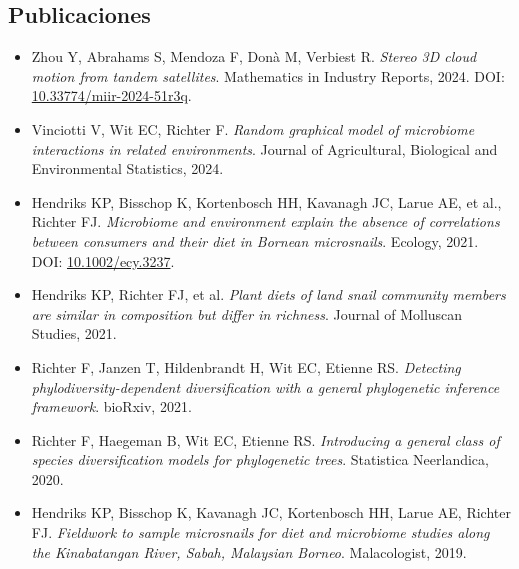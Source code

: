 \documentclass[11pt,a4paper]{article}
\begin{document}
\subsection{Publicaciones}
\begin{itemize}
    \item Zhou Y, Abrahams S, Mendoza F, Donà M, Verbiest R. \textit{Stereo 3D cloud motion from tandem satellites}. Mathematics in Industry Reports, 2024. DOI: \href{https://doi.org/10.33774/miir-2024-51r3q}{10.33774/miir-2024-51r3q}.
    \item Vinciotti V, Wit EC, Richter F. \textit{Random graphical model of microbiome interactions in related environments}. Journal of Agricultural, Biological and Environmental Statistics, 2024.
    \item Hendriks KP, Bisschop K, Kortenbosch HH, Kavanagh JC, Larue AE, et al., Richter FJ. \textit{Microbiome and environment explain the absence of correlations between consumers and their diet in Bornean microsnails}. Ecology, 2021. DOI: \href{https://doi.org/10.1002/ecy.3237}{10.1002/ecy.3237}.
    \item Hendriks KP, Richter FJ, et al. \textit{Plant diets of land snail community members are similar in composition but differ in richness}. Journal of Molluscan Studies, 2021.
    \item Richter F, Janzen T, Hildenbrandt H, Wit EC, Etienne RS. \textit{Detecting phylodiversity-dependent diversification with a general phylogenetic inference framework}. bioRxiv, 2021.
    \item Richter F, Haegeman B, Wit EC, Etienne RS. \textit{Introducing a general class of species diversification models for phylogenetic trees}. Statistica Neerlandica, 2020.
    \item Hendriks KP, Bisschop K, Kavanagh JC, Kortenbosch HH, Larue AE, Richter FJ. \textit{Fieldwork to sample microsnails for diet and microbiome studies along the Kinabatangan River, Sabah, Malaysian Borneo}. Malacologist, 2019.
\end{itemize}
\end{document}
